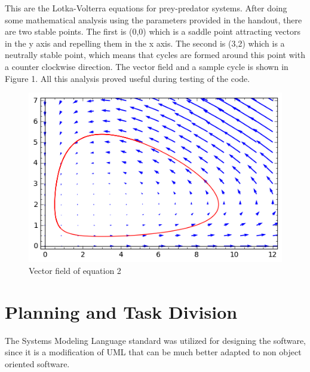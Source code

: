 \documentclass[12pt,a4paper]{article}
\begin{document}
This are the Lotka-Volterra equations for prey-predator systems. After doing some mathematical analysis using the parameters provided in the handout, there are two stable points. The first is (0,0) which is a saddle point attracting vectors in the y axis and repelling them in the x axis. The second is (3,2) which is a neutrally stable point, which means that cycles are formed around this point with a counter clockwise direction. The vector field and a sample cycle is shown in Figure 1. All this analysis proved useful during testing of the code.  %


\clearpage


\begin{figure}[hb]
    \centering
    \includegraphics[scale=0.75]{images/sage2.png}
    \caption{Vector field of equation 2}
\end{figure}



\section{Planning and Task Division}

The Systems Modeling Language standard was utilized for designing the software, since it is a modification of UML that can be much better adapted to non object oriented software. 
\end{document}
